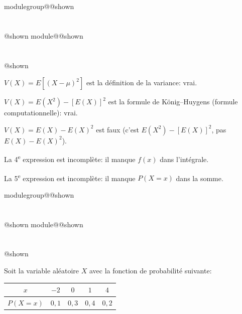 \documentclass{Evaluation}
\makeatletter
\newcommand{\currentmodulekey}{}
\newcommand{\currentmoduletitle}{}
\newcommand{\currentgroupkey}{}
\newcommand{\currentgrouptitle}{}
\newcommand{\showmoduleifneeded}{%
  \ifx\currentgroupkey\empty\else
    \expandafter\ifx\csname modulegroup@\currentgroupkey @shown\endcsname\relax
      \section*{\currentgrouptitle}%
      \expandafter\gdef\csname modulegroup@\currentgroupkey @shown\endcsname{1}%
    \fi
  \fi
  \expandafter\ifx\csname module@\currentmodulekey @shown\endcsname\relax
    \section*{\currentmoduletitle}%
    \expandafter\gdef\csname module@\currentmodulekey @shown\endcsname{1}%
  \fi
}
\newenvironment{A25}{\showmoduleifneeded}{}
\makeatother
\begin{document}
\begin{questions}
\begin{A25}
\begin{solution}
    $V(X)=E[(X-\mu)^2]$ est la définition de la variance: vrai.

    $V(X)=E(X^2)-[E(X)]^2$ est la formule de König--Huygens (formule computationnelle): vrai.

    $V(X) = E(X)-E(X)^2$ est faux (c'est $E(X^2)-[E(X)]^2$, pas $E(X)-E(X)^2$).

    La 4\textsuperscript{e} expression est incomplète: il manque $f(x)$ dans l'intégrale.

    La 5\textsuperscript{e} expression est incomplète: il manque $P(X=x)$ dans la somme.
\end{solution}
\end{A25}

\begin{A25}
\question Soit la variable aléatoire $X$ avec la fonction de probabilité suivante:

\begin{center}
\begin{tabular}{c|cccc}
    $x$ & $-2$ & $0$ & $1$ & $4$ \\
    \hline
    $P(X=x)$ & $0{,}1$ & $0{,}3$ & $0{,}4$ & $0{,}2$ \\
\end{tabular}
\end{center}

\end{A25}
\end{questions}
\end{document}

